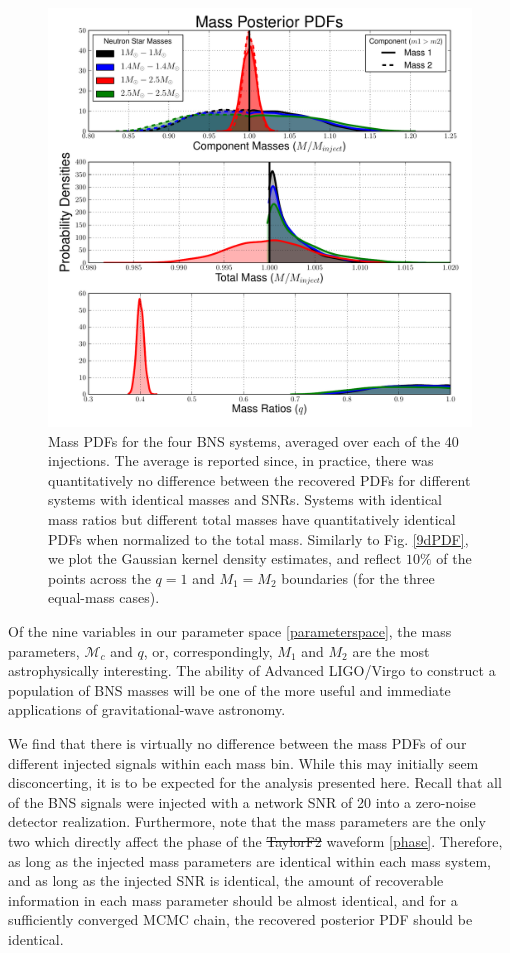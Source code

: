 \documentclass[11pt,a4paper]{emulateapj} 
\newcommand{\chmass}{\mathcal{M}_c}
\begin{document}
\begin{figure}[ht!]
  \centering \includegraphics[trim=3cm 0cm 2cm 0cm,
    clip=false,scale=0.75]{newMasses.pdf}
 \caption{Mass PDFs for the four BNS systems, averaged over each of
   the 40 injections.  The average is reported since, in practice,
   there was quantitatively no difference between the recovered PDFs
   for different systems with identical masses and SNRs.  Systems with
   identical mass ratios but different total masses have
   quantitatively identical PDFs when normalized to the total
   mass.  Similarly to Fig. \ref{9dPDF}, we plot the Gaussian kernel density
   estimates, and reflect $10\%$ of the points across the $q = 1$ and $M_1 = M_2$ boundaries (for the three equal-mass cases).}
  \label{metaMassPDFs}
\end{figure}

Of the nine variables in our parameter space \eqref{parameterspace},
the mass parameters, $\chmass$ and $q$, or, correspondingly, $M_1$ and
$M_2$ are the most astrophysically interesting.  The ability of
Advanced LIGO/Virgo to construct a population of BNS masses will be
one of the more useful and immediate applications of gravitational-wave astronomy.

We find that there is virtually no difference between the mass PDFs of
our different injected signals within each mass bin.  While this may
initially seem disconcerting, it is to be expected for the analysis presented here.
  Recall that all
of the BNS signals were injected with a network SNR of 20 into a
zero-noise detector realization.  Furthermore, note that the mass
parameters are the only two which directly affect the phase of the
\sout{TaylorF2} waveform \eqref{phase}.  Therefore, as long as the injected
mass parameters are identical within each mass system, and as long as
the injected SNR is identical, the amount of recoverable information
in each mass parameter should be almost identical, and for a
sufficiently converged MCMC chain, the recovered posterior PDF should
be identical.
\end{document}
